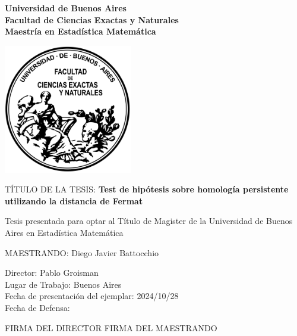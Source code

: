 \begin{titlepage}
	\begin{center}

	    \huge
		\textbf{Universidad de Buenos Aires}\\
		\vspace{0.3cm}
		\textbf{Facultad de Ciencias Exactas y Naturales}\\
        \vspace{0.3cm}
		\textbf{Maestría en Estadística Matemática}\\

		\vspace{1.2cm}

		\includegraphics[width=0.42\textwidth]{latex/logo.png}

		\vspace{1.1cm}

		\Large
        TÍTULO DE LA TESIS: \textbf{Test de hipótesis sobre homología persistente utilizando la distancia de Fermat}\\
		\vspace{1.1cm}

		\large
		Tesis presentada para optar al Título de Magister de la Universidad de Buenos Aires en Estadística Matemática
        \vspace{1.1cm}

        \textrm{MAESTRANDO: Diego Javier Battocchio}\\

		\vspace{1cm}

		\raggedright
		\large
		\textrm{Director: Pablo Groisman} \\
		\textrm{Lugar de Trabajo: Buenos Aires} \\
		\textrm{Fecha de presentación del ejemplar: 2024/10/28} \\
		\textrm{Fecha de Defensa: } \\

		\vfill

		\raggedleft
		FIRMA DEL DIRECTOR \hfill FIRMA DEL MAESTRANDO


	\end{center}
\end{titlepage}
